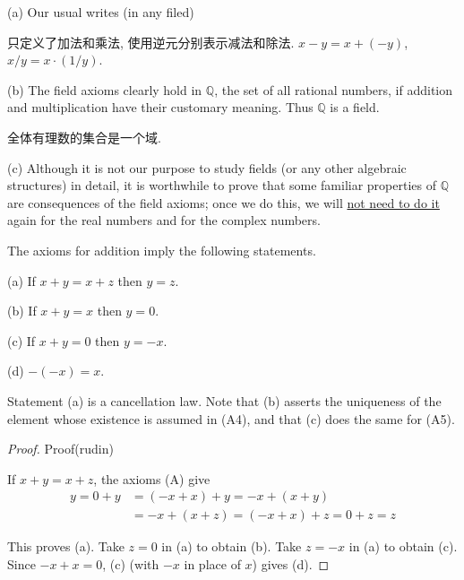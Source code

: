 \begin{myRemark}\label{myRemark:1.13}
(a) Our usual writes (in any filed)

只定义了加法和乘法, 使用逆元分别表示减法和除法.
$x-y = x+(-y)$, $x/y=x\cdot (1/y)$.

(b) The field axioms clearly hold in $\mathbb{Q}$, the set of all rational numbers, if
addition and multiplication have their customary meaning. Thus $\mathbb{Q}$ is a
field.

全体有理数的集合是一个域.

(c) Although it is not our purpose to study fields (or any other algebraic
structures) in detail, it is worthwhile to prove that some familiar properties
of $\mathbb{Q}$ are consequences of the field axioms; once we do this, we will \underline{not
need to do it} again for the real numbers and for the complex numbers.
\end{myRemark}

\begin{myProposition}\label{myProposition:1.14}
The axioms for addition imply the following statements.

(a) If $x+y=x+z$ then $y=z$.

(b) If $x+y=x$ then $y=0$.

(c) If $x+y=0$ then $y= -x$.

(d) $-(-x)=x$.
\end{myProposition}

Statement (a) is a cancellation law. Note that (b) asserts the uniqueness
of the element whose existence is assumed in (A4), and that (c) does the same
for (A5).



\begin{proof}
    Proof(rudin)

If $x + y =x + z$, the axioms (A) give
\begin{align*}
    y =0+y&=(-x+x)+y=-x+(x+y)\\
    &=-x+(x+z)=(-x+x)+z=0+z=z
\end{align*}

This proves (a). Take $z = 0$ in (a) to obtain (b). Take $z= -x$ in (a) to
obtain (c).
Since $-x + x = 0$, (c) (with $-x$ in place of $x$) gives (d).
\end{proof}

